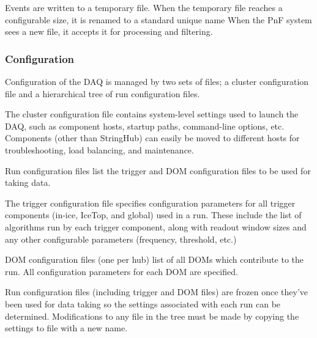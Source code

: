 Events are written to a temporary file.  When the temporary
file reaches a configurable size, it is renamed to a standard unique name
When the PnF system sees a new file, it accepts it for
processing and filtering.


\subsubsection{Configuration}

Configuration of the DAQ is managed by two sets of files; a cluster
configuration file and a hierarchical tree of run configuration files.

The cluster configuration file contains system-level settings used to launch
the DAQ, such as component hosts, startup paths, command-line options, etc.
Components
(other than StringHub) can easily be moved to different hosts for
troubleshooting, load balancing, and maintenance.

Run configuration files list the trigger and DOM configuration files to be
used for taking data.

The trigger configuration file specifies configuration parameters for all
trigger components (in-ice, IceTop, and global) used in a run.  These include
the list of algorithms run by each trigger component, along with readout window
sizes and any other configurable parameters (frequency, threshold, etc.)

DOM configuration files (one per hub) list of all DOMs which contribute to the
run.  All configuration parameters for each DOM are specified.

Run configuration files (including trigger and DOM files) are frozen once
they've been used for data taking so the settings associated with each run can
be determined.  Modifications to any file in the tree must be made by copying
the settings to file with a new name.

